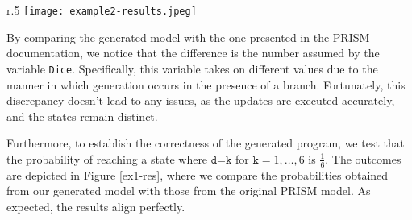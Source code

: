 \begin{comment}
\begin{lstlisting}[style=prism-color,caption={Generated PRISM program for the Dice Program.},captionpos=b,label={ex1-gen}]
dtmc

module Dice
	Dice : [0..11] init 0;
	d : [0..6] init 0; 

	[] (Dice=0)  $\rightarrow$ 0.5 :  (Dice'=2) + 0.5 :  (Dice'=6); 
	[] (Dice=2)  $\rightarrow$ 0.5 :  (Dice'=3) + 0.5 :  (Dice'=4); 
	[] (Dice=3)  $\rightarrow$ 0.5 :  (Dice'=2) + 0.5 : (d'=1)&(Dice'=10); 
	[] (Dice=4)  $\rightarrow$ 0.5 : (d'=2)$\&$(Dice'=10) + 0.5 : (d'=3)$\&$(Dice'=10);
	[] (Dice=6)  $\rightarrow$ 0.5 :  (Dice'=7) + 0.5 : (Dice'=8); 
	[] (Dice=7)  $\rightarrow$ 0.5 :  (Dice'=6) + 0.5 : (d'=4)$\&$(Dice'=10);
	[] (Dice=8)  $\rightarrow$ 0.5 : (d'=5)$\&$(Dice'=10) + 0.5 : (d'=6)$\&$(Dice'=10); 
	[] (Dice=10)  $\rightarrow$ 1 :  (Dice'=10);

endmodule
	
\end{lstlisting}
\end{comment}
\begin{wrapfigure}[10]{r}{.5\textwidth}
    \centering
	\vspace{-20pt}
	\texttt{[image: example2-results.jpeg]}	
	\vspace{-25pt}

	\caption{Probability of reaching a state where $d=k$, for $k=1,\ldots,6.$}
	\label{ex1-res}
\end{wrapfigure}
By comparing the generated model with the one presented in the PRISM documentation, we notice that the difference is the number assumed by the variable {\tt Dice}. 
Specifically, this variable takes on different values due to the manner in which generation occurs in the presence of a branch. Fortunately, this discrepancy doesn't lead to any issues, as the updates are executed accurately, and the states remain distinct.

Furthermore, to establish the correctness of the generated program, we test that the probability of reaching a state where $\texttt{d=k}$ for $\texttt{k}=1,\ldots,6$ is $\frac{1}{6}$. The outcomes are depicted in Figure \ref{ex1-res}, where we compare the probabilities obtained from our generated model with those from the original PRISM model. As expected, the results align perfectly.

